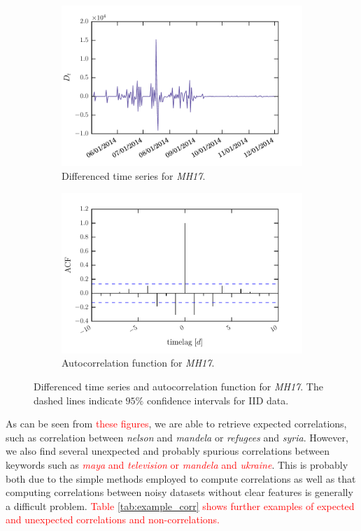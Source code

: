\documentclass[12pt, a4paper]{article}
\begin{document}
\begin{figure}
\centering
\begin{subfigure}{.5\textwidth}
  \centering
  \includegraphics[width=.9\linewidth]{figs/mh17_diff.pdf}
  \caption{Differenced time series for \textit{MH17}.}
\end{subfigure}%
\begin{subfigure}{.5\textwidth}
  \centering
  \includegraphics[width=.9\linewidth]{figs/mh17_acf.pdf}
  \caption{Autocorrelation function for \textit{MH17}.}
\end{subfigure}
\caption{Differenced time series and autocorrelation function for \textit{MH17}. The dashed lines indicate $95 \%$ confidence intervals for IID data.}
\label{fig:diff_acf}
\end{figure}

As can be seen from \textcolor{red}{these figures}, we are able to retrieve expected correlations, such as correlation between \textit{nelson} and \textit{mandela} or \textit{refugees} and \textit{syria}. However, we also find several unexpected and probably spurious correlations between keywords such as \textcolor{red}{\textit{maya} and \textit{television} or \textit{mandela} and \textit{ukraine}}. 
This is probably both due to the simple methods employed to compute correlations as well as that computing correlations between noisy datasets without clear features is generally a difficult problem. \textcolor{red}{Table \ref{tab:example_corr} shows further examples of expected and unexpected correlations and non-correlations.}
\end{document}
